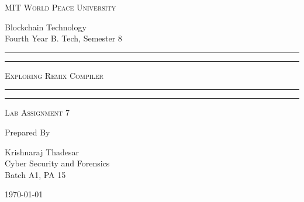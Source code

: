\documentclass[11pt]{article}
\begin{document}
\begin{titlepage}
	\centering


	\huge\textsc{
		MIT World Peace University
	}\\

	\vspace{0.75\baselineskip} %

	\LARGE{
        Blockchain Technology\\
		Fourth Year B. Tech, Semester 8
	}

	\vfill %


	\rule{\textwidth}{1.6pt}\vspace*{-\baselineskip}\vspace*{2pt}
	\rule{\textwidth}{0.6pt}
	\vspace{0.75\baselineskip} %

	\huge{\textsc{
        Exploring Remix Compiler
        }} \\

	\vspace{0.5\baselineskip} %
	\rule{\textwidth}{0.6pt}\vspace*{-\baselineskip}\vspace*{2.8pt}
	\rule{\textwidth}{1.6pt}

	\vspace{1\baselineskip} %


	\LARGE\textsc{
		Lab Assignment 7
	} %
	\vfill


	Prepared By \vspace{0.5\baselineskip} %

	\Large{
		Krishnaraj Thadesar \\
		Cyber Security and Forensics\\
        Batch A1, PA 15
	}

	\vspace{0.5\baselineskip} %
	\today

\end{titlepage}
\end{document}
